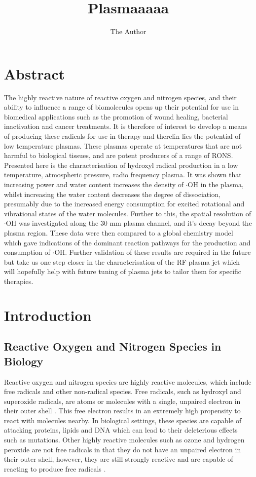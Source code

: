 \documentclass[11pt, oneside]{article}   	%
\title{Plasmaaaaa}
\author{The Author}
\begin{document}
\maketitle

\section{Abstract}

The highly reactive nature of reactive oxygen and nitrogen species, and their ability to influence a range of biomolecules opens up their potential for use in biomedical applications such as the promotion of wound healing, bacterial inactivation and cancer treatments.
It is therefore of interest to develop a means of producing these radicals for use in therapy and therelin lies the potential of low temperature plasmas.
These plasmas operate at temperatures that are not harmful to biological tissues, and are potent producers of a range of RONS.
Presented here is the characterisation of hydroxyl radical production in a low temperature, atmospheric pressure, radio frequency plasma.
It was shown that increasing power and water content increases the density of $\cdot$OH in the plasma, whilst increasing the water content decreases the degree of dissociation, presumably due to the increased energy consumption for excited rotational and vibrational states of the water molecules.
Further to this, the spatial resolution of $\cdot$OH was investigated along the 30 mm plasma channel, and it's decay beyond the plasma region. These data were then compared to a global chemistry model which gave indications of the dominant reaction pathways for the production and consumption of $\cdot$OH.
Further validation of these results are required in the future but take us one step closer in the characterisation of the RF plasma jet which will hopefully help with future tuning of plasma jets to tailor them for specific therapies.

\section{Introduction}

\subsection{Reactive Oxygen and Nitrogen Species in Biology} \label{sec:RONSinBiology}

Reactive oxygen and nitrogen species are highly reactive molecules, which include free radicals and other non-radical species. 
Free radicals, such as hydroxyl and superoxide radicals, are atoms or molecules with a single, unpaired electron in their outer shell \cite{PhamHuy2008}. 
This free electron results in an extremely high propensity to react with molecules nearby. 
In biological settings, these species are capable of attacking proteins, lipids and DNA \cite{PhamHuy2008} which can lead to their deleterious effects such as mutations.
Other highly reactive molecules such as ozone and hydrogen peroxide are not free radicals in that they do not have an unpaired electron in their outer shell, however, they are still strongly reactive and are capable of reacting to produce free radicals \cite{PhamHuy2008}.
\end{document}
